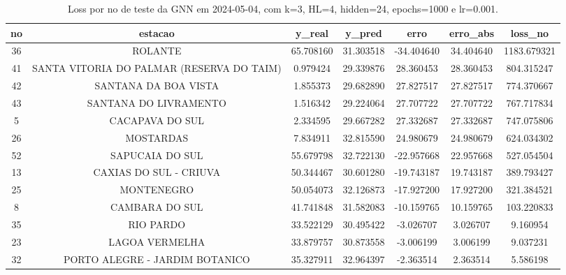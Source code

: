 \begin{table}[h]
\centering
\caption{Loss por no de teste da GNN em 2024-05-04, com k=3, HL=4, hidden=24, epochs=1000 e lr=0.001.}
\label{tab:gnn_loss_k3_hl4_h24_e1000_d20240504}
\begin{tabular}{ccccccc}
\toprule
no & estacao & y\_real & y\_pred & erro & erro\_abs & loss\_no \\
\midrule
36 & ROLANTE & 65.708160 & 31.303518 & -34.404640 & 34.404640 & 1183.679321 \\
41 & SANTA VITORIA DO PALMAR (RESERVA DO TAIM) & 0.979424 & 29.339876 & 28.360453 & 28.360453 & 804.315247 \\
42 & SANTANA DA BOA VISTA & 1.855373 & 29.682890 & 27.827517 & 27.827517 & 774.370667 \\
43 & SANTANA DO LIVRAMENTO & 1.516342 & 29.224064 & 27.707722 & 27.707722 & 767.717834 \\
5 & CACAPAVA DO SUL & 2.334595 & 29.667282 & 27.332687 & 27.332687 & 747.075806 \\
26 & MOSTARDAS & 7.834911 & 32.815590 & 24.980679 & 24.980679 & 624.034302 \\
52 & SAPUCAIA DO SUL & 55.679798 & 32.722130 & -22.957668 & 22.957668 & 527.054504 \\
13 & CAXIAS DO SUL - CRIUVA & 50.344467 & 30.601280 & -19.743187 & 19.743187 & 389.793427 \\
25 & MONTENEGRO & 50.054073 & 32.126873 & -17.927200 & 17.927200 & 321.384521 \\
8 & CAMBARA DO SUL & 41.741848 & 31.582083 & -10.159765 & 10.159765 & 103.220833 \\
35 & RIO PARDO & 33.522129 & 30.495422 & -3.026707 & 3.026707 & 9.160954 \\
23 & LAGOA VERMELHA & 33.879757 & 30.873558 & -3.006199 & 3.006199 & 9.037231 \\
32 & PORTO ALEGRE - JARDIM BOTANICO & 35.327911 & 32.964397 & -2.363514 & 2.363514 & 5.586198 \\
\bottomrule
\end{tabular}
\end{table}
